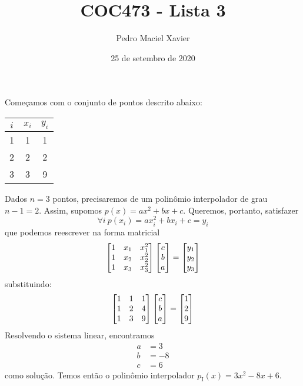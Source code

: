 \documentclass{homework}
\title{COC473 - Lista 3}
\author{Pedro Maciel Xavier}
\date{25 de setembro de 2020}
\begin{document}
	
	\maketitle
	
	\quest%
	
	Começamos com o conjunto de pontos descrito abaixo:
	
	\begin{fig}
		\begin{tabular}{|c|c|c|}
			\hline
			$i$ & $x_i$ & $y_i$\\
			\hline
			1 & 1 & 1\\
			2 & 2 & 2\\
			3 & 3 & 9\\
			\hline
		\end{tabular}
	\end{fig}

	Dados $n = 3$ pontos, precisaremos de um polinômio interpolador de grau $n - 1 = 2$. Assim, supomos $p(x) = a x^2 + b x + c$. Queremos, portanto, satisfazer
		$$ \forall i ~ p(x_i) = a x_i^2 + b x_i + c = y_i  $$
	que podemos reescrever na forma matricial
		$$ \left[\begin{array}{@{}ccc@{}} %
		1 & x_1 & x_1^2\\
		1 & x_2 & x_2^2\\
		1 & x_3 & x_3^2\\
		\end{array}\right]%
		\left[\begin{array}{@{}c@{}} %
		c\\
		b\\
		a 
		\end{array}\right]
		=		
		\left[\begin{array}{@{}c@{}} %
		y_1\\
		y_2\\
		y_3 
		\end{array}\right]
		$$
	substituindo:
		$$ \left[\begin{array}{@{}ccc@{}} %
		1 & 1 & 1\\
		1 & 2 & 4\\
		1 & 3 & 9\\
		\end{array}\right]%
		\left[\begin{array}{@{}c@{}} %
		c\\
		b\\
		a 
		\end{array}\right]
		=		
		\left[\begin{array}{@{}c@{}} %
		1\\
		2\\
		9
		\end{array}\right]
		$$
	Resolvendo o sistema linear, encontramos
		\begin{align*}
			a &= 3\\
			b &= -8\\
			c &= 6
		\end{align*}
	como solução. Temos então o polinômio interpolador $p_\text{I}(x) = 3 x^2 - 8 x + 6$.
\end{document}
